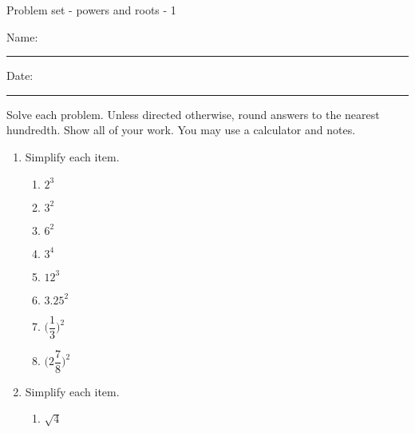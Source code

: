 \documentclass[12pt]{article}
\begin{document}
\pagestyle{empty} %
\begin{center}
          Problem set - powers and roots - 1 \\[0.5in]
\end{center}
Name: \rule{4in}{0.005in} Date: \rule{1.5in}{0.005in} 
  \vspace{0.25in}

Solve each problem. Unless directed otherwise, round answers to the nearest hundredth. Show all of your work. You may use a calculator and notes. 
\begin{enumerate}
\newcommand{\spacing}{\vspace{0.50in}}
\item Simplify each item. 
	\begin{multicols}{2}
	\begin{enumerate}
    	\item \hspace{0.50in} $2^3$
	\spacing

    	\item \hspace{0.50in} $3^2$
  	\spacing

    	\item \hspace{0.50in} $6^2$
	\spacing

    	\item \hspace{0.50in} $3^4$
	\spacing

    	\item \hspace{0.50in} $12^3$
	\spacing

    	\item \hspace{0.50in} $3.25^2$
	\spacing

	\item \hspace{0.50in} $\Big(\dfrac{1}{3}\Big)^2$
	\spacing

	\item \hspace{0.50in} $\Big(2\dfrac{7}{8}\Big)^2$
	\spacing

	\end{enumerate}
	\end{multicols}
	\spacing

\item Simplify each item. 
	\begin{multicols}{2}
	\begin{enumerate}
	\item \hspace{0.50in} $\sqrt{4}$
	\spacing


\end{enumerate}
\end{multicols}
\end{enumerate}
\end{document}
